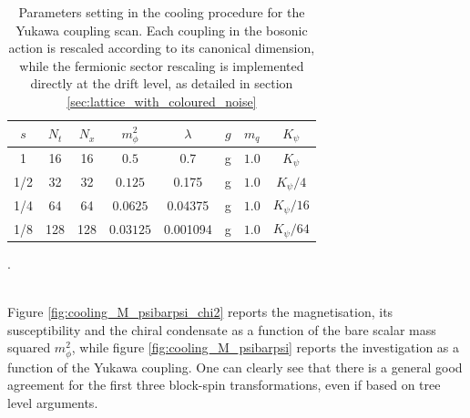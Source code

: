 \begin{table}[htp]
    \centering
    \begin{tabular}{cccccccc}
        \toprule
        $s$ & $N_t$ & $N_x$ & $m_\phi^2$ & $\lambda$ & $g$ & $m_q$& $K_\psi$ \\
        \midrule 
        1 & 16 & 16 & $0.5$ & 0.7 & g & $1.0$ & $K_\psi$ \\
        1/2 & 32 & 32 & $0.125$ & 0.175 & g & $1.0$ & $K_\psi/4$ \\
        1/4 & 64 & 64 & $0.0625$ & 0.04375 & g & $1.0$ & $K_\psi/16$ \\
        1/8 & 128 & 128 & $0.03125$ & 0.001094 & g & $1.0$ & $K_\psi/64$ \\
        \bottomrule
    \end{tabular}
    \caption[Parameter settings in the cooling procedure for the Yukawa coupling scan.]{Parameters setting in the cooling procedure for the Yukawa coupling scan. Each coupling in the bosonic action is rescaled according to its canonical dimension, while the fermionic sector rescaling is implemented directly at the drift level, as detailed in section \ref{sec:lattice_with_coloured_noise}}.
    \label{tab:params_cooling_yukawa}
\end{table} \\
Figure \ref{fig:cooling_M_psibarpsi_chi2} reports the magnetisation, its susceptibility and the chiral condensate as a function of the bare scalar mass squared $m_\phi^2$, while figure \ref{fig:cooling_M_psibarpsi} reports the investigation as a function of the Yukawa coupling.
One can clearly see that there is a general good agreement for the first three block-spin transformations, even if based on tree level arguments.
